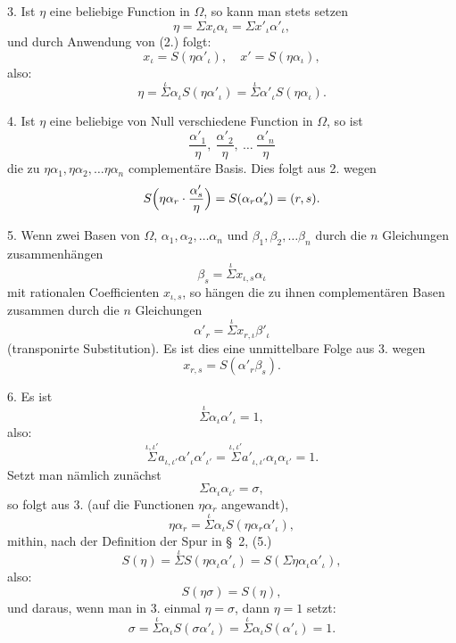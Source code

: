\documentclass{article}
\begin{document}
3. Ist $\eta$ eine beliebige Function in $\Omega$, so kann man stets setzen
\[ \eta = \Sigma x_{\iota}\alpha_{\iota} = \Sigma x'_{\iota}\alpha'_{\iota}, \]
und durch Anwendung von (2.) folgt:
\[ x_{\iota} = S(\eta\alpha'_{\iota}), \quad x' = S(\eta\alpha_{\iota}), \]
also:
\[ \eta = \overset{\iota}{\Sigma}\alpha_{\iota}S(\eta\alpha'_{\iota}) = \overset{\iota}{\Sigma}\alpha'_{\iota}S(\eta\alpha_{\iota}). \tag{3.} \]

4. Ist $\eta$ eine beliebige von Null verschiedene Function in $\Omega$, so ist
\[ \frac{\alpha'_{1}}{\eta}, \ \frac{\alpha'_{2}}{\eta}, \ \ldots \ \frac{\alpha'_{n}}{\eta} \]
die zu $\eta\alpha_{1}, \eta\alpha_{2}, \ldots \eta\alpha_{n}$ complementäre Basis. Dies folgt aus 2. wegen
\[ S\Bigl(\eta\alpha_{r}\cdot\frac{\alpha'_{s}}{\eta}\Bigr) = S(\alpha_{r}\alpha'_{s}) = (r, s). \]


5. Wenn zwei Basen von $\Omega$, $\alpha_{1}, \alpha_{2}, \ldots \alpha_{n}$ und $\beta_{1}, \beta_{2}, \ldots \beta_{n}$ durch die $n$ Gleichungen zusammenhängen
\[ \beta_{s} = \overset{\iota}{\Sigma} x_{\iota,s}\alpha_{\iota} \]
mit rationalen Coefficienten $x_{\iota,s}$, so hängen die zu ihnen complementären Basen zusammen durch die $n$ Gleichungen
\[ \alpha'_{r} = \overset{\iota}{\Sigma} x_{r,\iota}\beta'_{\iota} \]
(transponirte Substitution). Es ist dies eine unmittelbare Folge aus 3. wegen
\[ x_{r,s} = S(\alpha'_{r}\beta_{s}). \]

6. Es ist
\[ \overset{\iota}{\Sigma}\alpha_{\iota}\alpha'_{\iota} = 1, \]
also:
\[ \overset{\iota,\iota'}{\Sigma} a_{\iota,\iota'}\alpha'_{\iota}\alpha'_{\iota'} = \overset{\iota,\iota'}{\Sigma} a'_{\iota,\iota'}\alpha_{\iota}\alpha_{\iota'} = 1. \]
Setzt man nämlich zunächst
\[ \Sigma\alpha_{\iota}\alpha_{\iota'} = \sigma, \]
so folgt aus 3. (auf die Functionen $\eta\alpha_{r}$ angewandt),
\[ \eta\alpha_{r} = \overset{\iota}{\Sigma}\alpha_{\iota}S(\eta\alpha_{r}\alpha'_{\iota}), \]
mithin, nach der Definition der Spur in §~2, (5.)
\[ S(\eta) = \overset{\iota}{\Sigma} S(\eta\alpha_{\iota}\alpha'_{\iota}) = S(\Sigma\eta\alpha_{\iota}\alpha'_{\iota}), \]
also:
\[ S(\eta\sigma) = S(\eta), \]
und daraus, wenn man in 3. einmal $\eta = \sigma$, dann $\eta = 1$ setzt:
\[ \sigma = \overset{\iota}{\Sigma}\alpha_{\iota}S(\sigma\alpha'_{\iota}) = \overset{\iota}{\Sigma}\alpha_{\iota}S(\alpha'_{\iota}) = 1. \]
\end{document}
